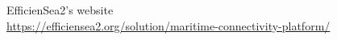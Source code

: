 \begin{thebibliography}{1}
		EfficienSea2's website\\
		\url{https://efficiensea2.org/solution/maritime-connectivity-platform/}
\end{thebibliography}